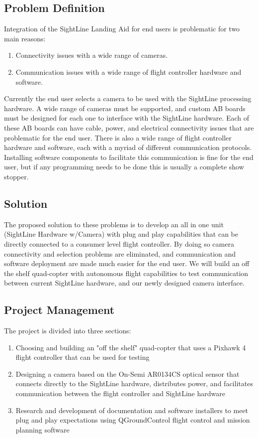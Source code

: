 \documentclass[11pt]{article}
\begin{document}
\subsection{Problem Definition}

Integration of the SightLine Landing Aid for end users is problematic for two main reasons: 

\begin{enumerate}
\item Connectivity issues with a wide range of cameras. 
\item Communication issues with a wide range of flight controller hardware and software.
\end{enumerate} 

Currently the end user selects a camera to be used with the SightLine processing hardware. A wide range of cameras must be supported, and custom AB boards must be designed for each one to interface with the SightLine hardware. Each of these AB boards can have cable, power, and electrical connectivity issues that are problematic for the end user.
There is also a wide range of flight controller hardware and software, each with a myriad of different communication protocols. Installing software components to facilitate this communication is fine for the end user, but if any programming needs to be done this is usually a complete show stopper. 

\subsection{Solution}

The proposed solution to these problems is to develop an all in one unit (SightLine Hardware w/Camera) with plug and play capabilities that can be directly connected to a consumer level flight controller. By doing so camera connectivity and selection problems are eliminated, and communication and software deployment are made much easier for the end user. We will build an off the shelf quad-copter with autonomous flight capabilities to test communication between current SightLine hardware, and our newly designed camera interface.

\subsection{Project Management}

The project is divided into three sections:
\begin{enumerate}
 \item Choosing and building an "off the shelf" quad-copter that uses a Pixhawk 4 flight controller that can be used for testing
 \item Designing a camera based on the On-Semi AR0134CS optical sensor that connects directly to the SightLine hardware, distributes power, and facilitates communication  between the flight controller and SightLine hardware
 \item Research and development of documentation and software installers to meet plug and play expectations using QGroundControl flight control and mission planning software
\end{enumerate}
\end{document}
